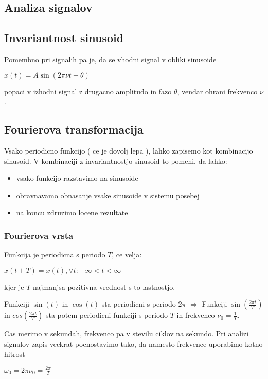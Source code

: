 \documentclass{article}
\begin{document}
\begin{multicols}{4}
\section{Analiza signalov}

\subsection{Invariantnost sinusoid}

Pomembno pri signalih pa je, da se vhodni signal v obliki sinusoide
\begin{center}
    \begin{math}
        x(t) = A \sin (2 \pi \nu t + \theta)
    \end{math}
\end{center}
popaci v izhodni signal z drugacno amplitudo in fazo $\theta$, vendar ohrani frekvenco $\nu$.

\subsection{Fourierova transformacija}
Vsako periodicno funkcijo ( ce je dovolj lepa ), lahko zapisemo kot kombinacijo sinusoid.
V kombinaciji z invariantnostjo sinusoid to pomeni, da lahko:
\begin{itemize}
    \item vsako funkcijo razstavimo na sinusoide
    \item obravnavamo obnasanje vsake sinusoide v sistemu posebej
    \item na koncu zdruzimo locene rezultate
\end{itemize}

\subsubsection{Fourierova vrsta}
Funkcija je periodicna s periodo $T$, ce velja:
\begin{center}
    \begin{math}
        x(t + T) = x(t), \forall t: -\infty < t < \infty
    \end{math}
\end{center}
kjer je $T$ najmanjsa pozitivna vrednost s to lastnostjo.

Funkciji $\sin(t)$ in $\cos(t)$ sta periodicni s periodo $2\pi$  $\Rightarrow$
Funkciji $\sin(\frac{2 \pi t}{T})$ in $cos(\frac{2 \pi t}{T})$ sta potem periodicni funkciji 
s periodo $T$ in frekvenco $\nu_0 = \frac{1}{T}$.

Cas merimo v sekundah, frekvenco pa v stevilu ciklov na sekundo. Pri analizi
signalov zapis veckrat poenostavimo tako, da namesto frekvence uporabimo kotno hitrost
\begin{center}
    \begin{math}
        \omega_0 = 2 \pi \nu_0 = \frac{2\pi}{T}
    \end{math}
\end{center}


\end{multicols}
\end{document}
